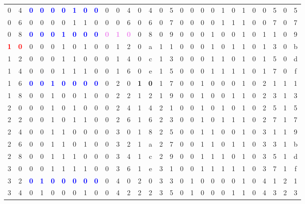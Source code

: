 \begin{table}
{\begin{tabular}{cc|ccccccc|ccc|cc||cc|ccccccc|ccc|cc}
0&4&\textcolor{blue}{\textbf{0}}&\textcolor{blue}{\textbf{0}}&\textcolor{blue}{\textbf{0}}&\textcolor{blue}{\textbf{0}}&\textcolor{blue}{\textbf{1}}&\textcolor{blue}{\textbf{0}}&\textcolor{blue}{\textbf{0}}&0&0&4&0&4&0&5&0&0&0&0&1&0&1&0&0&5&0&5\\%
\rowcolor{gray!20}0&6&0&0&0&0&1&1&0&0&0&6&0&6&0&7&0&0&0&0&1&1&1&0&0&7&0&7\\%
0&8&\textcolor{blue}{\textbf{0}}&\textcolor{blue}{\textbf{0}}&\textcolor{blue}{\textbf{0}}&\textcolor{blue}{\textbf{1}}&\textcolor{blue}{\textbf{0}}&\textcolor{blue}{\textbf{0}}&\textcolor{blue}{\textbf{0}}&\textcolor{violet}{\textbf{0}}&\textcolor{violet}{\textbf{1}}&\textcolor{violet}{\textbf{0}}&0&8&0&9&0&0&0&1&0&0&1&0&1&1&0&9\\%
\rowcolor{gray!20}\textcolor{red}{\textbf{1}}&\textcolor{red}{\textbf{0}}&0&0&0&1&0&1&0&0&1&2&0&a&1&1&0&0&0&1&0&1&1&0&1&3&0&b\\%
1&2&0&0&0&1&1&0&0&0&1&4&0&c&1&3&0&0&0&1&1&0&1&0&1&5&0&d\\%
\rowcolor{gray!20}1&4&0&0&0&1&1&1&0&0&1&6&0&e&1&5&0&0&0&1&1&1&1&0&1&7&0&f\\%
1&6&\textcolor{blue}{\textbf{0}}&\textcolor{blue}{\textbf{0}}&\textcolor{blue}{\textbf{1}}&\textcolor{blue}{\textbf{0}}&\textcolor{blue}{\textbf{0}}&\textcolor{blue}{\textbf{0}}&\textcolor{blue}{\textbf{0}}&0&2&0&\textcolor{green!80!black}{\textbf{1}}&\textcolor{green!80!black}{\textbf{0}}&1&7&0&0&1&0&0&0&1&0&2&1&1&1\\%
\rowcolor{gray!20}1&8&0&0&1&0&0&1&0&0&2&2&1&2&1&9&0&0&1&0&0&1&1&0&2&3&1&3\\%
2&0&0&0&1&0&1&0&0&0&2&4&1&4&2&1&0&0&1&0&1&0&1&0&2&5&1&5\\%
\rowcolor{gray!20}2&2&0&0&1&0&1&1&0&0&2&6&1&6&2&3&0&0&1&0&1&1&1&0&2&7&1&7\\%
2&4&0&0&1&1&0&0&0&0&3&0&1&8&2&5&0&0&1&1&0&0&1&0&3&1&1&9\\%
\rowcolor{gray!20}2&6&0&0&1&1&0&1&0&0&3&2&1&a&2&7&0&0&1&1&0&1&1&0&3&3&1&b\\%
2&8&0&0&1&1&1&0&0&0&3&4&1&c&2&9&0&0&1&1&1&0&1&0&3&5&1&d\\%
\rowcolor{gray!20}3&0&0&0&1&1&1&1&0&0&3&6&1&e&3&1&0&0&1&1&1&1&1&0&3&7&1&f\\%
3&2&\textcolor{blue}{\textbf{0}}&\textcolor{blue}{\textbf{1}}&\textcolor{blue}{\textbf{0}}&\textcolor{blue}{\textbf{0}}&\textcolor{blue}{\textbf{0}}&\textcolor{blue}{\textbf{0}}&\textcolor{blue}{\textbf{0}}&0&4&0&2&0&3&3&0&1&0&0&0&0&1&0&4&1&2&1\\%
\rowcolor{gray!20}3&4&0&1&0&0&0&1&0&0&4&2&2&2&3&5&0&1&0&0&0&1&1&0&4&3&2&3\\%

\end{tabular}}
\end{table}

